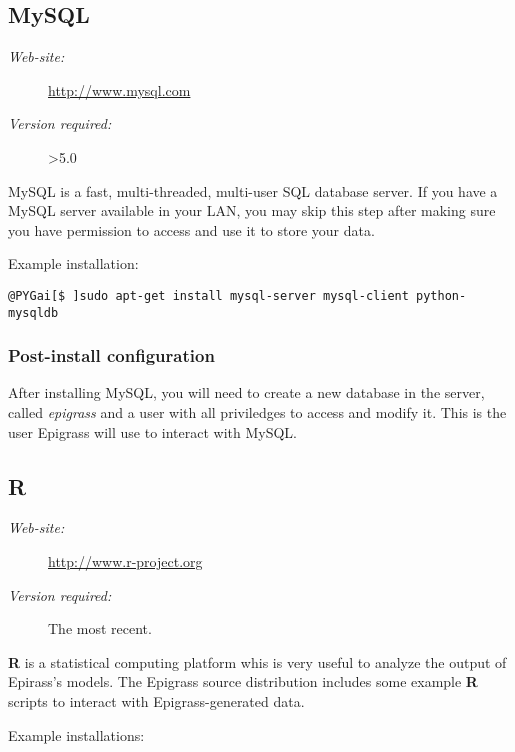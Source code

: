 \documentclass[a4paper,10pt]{manual}
\begin{document}
\subsection{MySQL}
\begin{description}
\item[\emph{Web-site:}]
\href{http://www.mysql.com}{http://www.mysql.com}

\item[\emph{Version required:}]
\textgreater{}5.0

\end{description}

MySQL is a fast, multi-threaded, multi-user SQL database server. If you have a MySQL server available in your LAN, you may skip this step after making sure you have permission to access and use it to store your data.

Example installation:

\begin{Verbatim}[commandchars=@\[\]]
@PYGai[$ ]sudo apt-get install mysql-server mysql-client python-mysqldb
\end{Verbatim}


\subsubsection{Post-install configuration}

After installing MySQL, you will need to create a new database in the server, called \emph{epigrass} and a user with all priviledges to access and modify it. This is the user Epigrass will use to interact with MySQL.


\subsection{R}
\begin{description}
\item[\emph{Web-site:}]
\href{http://www.r-project.org}{http://www.r-project.org}

\item[\emph{Version required:}]
The most recent.

\end{description}

\textbf{R} is a statistical computing platform whis is very useful to analyze the output of Epirass's models. The Epigrass source distribution includes some example \textbf{R} scripts to interact with Epigrass-generated data.

Example installations:
\end{document}

